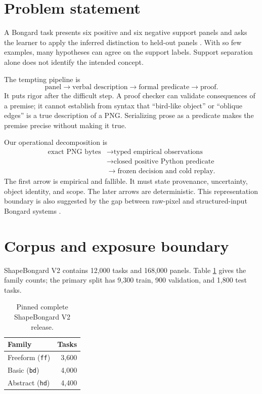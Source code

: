 \documentclass[11pt]{article}
\begin{document}
\section{Problem statement}

A Bongard task presents six positive and six negative support panels and asks
the learner to apply the inferred distinction to held-out panels
\cite{bongard1970pattern}.  With so few examples, many hypotheses can agree on
the support labels.  Support separation alone does not identify the intended
concept.

The tempting pipeline is
\begin{equation}
  \text{panel}\longrightarrow\text{verbal description}
  \longrightarrow\text{formal predicate}\longrightarrow\text{proof}.
  \label{eq:tempting}
\end{equation}
It puts rigor after the difficult step.  A proof checker can validate
consequences of a premise; it cannot establish from syntax that ``bird-like
object'' or ``oblique edges'' is a true description of a PNG.  Serializing
prose as a predicate makes the premise precise without making it true.

Our operational decomposition is
\begin{equation}
\begin{aligned}
\text{exact PNG bytes}
 &\longrightarrow \text{typed empirical observations}\\
 &\longrightarrow \text{closed positive Python predicate}\\
 &\longrightarrow \text{frozen decision and cold replay}.
\end{aligned}
\label{eq:pipeline}
\end{equation}
The first arrow is empirical and fallible.  It must state provenance,
uncertainty, object identity, and scope.  The later arrows are deterministic.
This representation boundary is also suggested by the gap between raw-pixel
and structured-input Bongard systems \cite{nie2020bongardlogo,
vaishnav2026symbolic,depeweg2018solving,sonwane2021using}.

\section{Corpus and exposure boundary}

ShapeBongard V2 contains 12,000 tasks and 168,000 panels.  Table
\ref{tab:corpus} gives the family counts; the primary split has 9,300 train,
900 validation, and 1,800 test tasks.

\begin{table}[h]
\centering
\begin{tabular}{lr}
\toprule
Family & Tasks \\
\midrule
Freeform (\texttt{ff}) & 3,600 \\
Basic (\texttt{bd}) & 4,000 \\
Abstract (\texttt{hd}) & 4,400 \\
\bottomrule
\end{tabular}
\caption{Pinned complete ShapeBongard V2 release.}
\label{tab:corpus}
\end{table}
\end{document}
